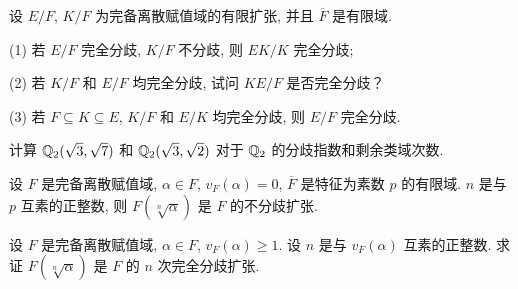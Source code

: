 \begin{Exercises}
\item 设 $E/F$, $K/F$ 为完备离散赋值域的有限扩张, 并且 $\overline{F}$ 是有限域.

(1) 若 $E/F$ 完全分歧, $K/F$ 不分歧, 则 $EK/K$ 完全分歧;

(2) 若 $K/F$ 和 $E/F$ 均完全分歧, 试问 $KE/F$ 是否完全分歧？

(3) 若 $F\subseteq K\subseteq E$, $K/F$ 和 $E/K$ 均完全分歧, 则 $E/F$ 完全分歧.

\item 计算 $\mathbb{Q}_2(\sqrt{3},\sqrt{7})$ 和 $\mathbb{Q}_2(\sqrt{3},\sqrt{2})$ 对于 $\mathbb{Q}_2$ 的分歧指数和剩余类域次数.

\item 设 $F$ 是完备离散赋值域, $\alpha\in F$, $v_F(\alpha)=0$, $\overline{F}$ 是特征为素数 $p$ 的有限域. $n$ 是与 $p$ 互素的正整数, 则 $F(\sqrt[n]{\alpha})$ 是 $F$ 的不分歧扩张.

\item 设 $F$ 是完备离散赋值域, $\alpha\in F$, $v_F(\alpha)\geqslant 1$. 设 $n$ 是与 $v_F(\alpha)$ 互素的正整数. 求证 $F(\sqrt[n]{\alpha})$ 是 $F$ 的 $n$ 次完全分歧扩张.
\end{Exercises}
